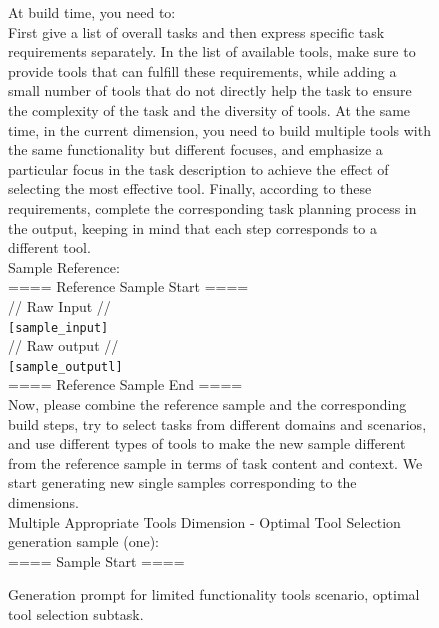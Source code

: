 \begin{figure}[!htb]
\begin{tcolorbox}[
    colback=white, 
    colframe=blue3,
    boxrule=0.5mm,
    arc=0mm,
    outer arc=0mm,
    title=Limited Functionality Tools: Optimal Tool Selection - Generation Prompt
]
At build time, you need to:\\
First give a list of overall tasks and then express specific task requirements separately. In the list of available tools, make sure to provide tools that can fulfill these requirements, while adding a small number of tools that do not directly help the task to ensure the complexity of the task and the diversity of tools. At the same time, in the current dimension, you need to build multiple tools with the same functionality but different focuses, and emphasize a particular focus in the task description to achieve the effect of selecting the most effective tool. Finally, according to these requirements, complete the corresponding task planning process in the output, keeping in mind that each step corresponds to a different tool.\\

Sample Reference:\\
==== Reference Sample Start ====\\
// Raw Input //\\
\colorbox{blue3!50}{\texttt{[sample\_input]}}\\

// Raw output //\\
\colorbox{blue3!50}{\texttt{[sample\_outputl]}}\\
==== Reference Sample End ====\\
Now, please combine the reference sample and the corresponding build steps, try to select tasks from different domains and scenarios, and use different types of tools to make the new sample different from the reference sample in terms of task content and context. We start generating new single samples corresponding to the dimensions.\\
Multiple Appropriate Tools Dimension - Optimal Tool Selection generation sample (one):\\
==== Sample Start ====
\end{tcolorbox}
\caption{Generation prompt for limited functionality tools scenario, optimal tool selection subtask.}
\label{fig:best-prompt}
\end{figure}